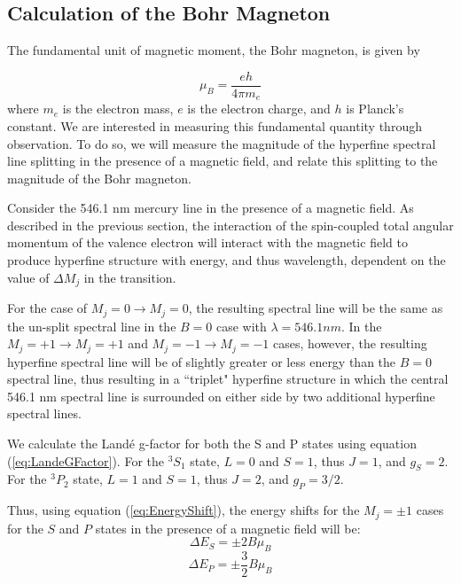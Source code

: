 \documentclass[twocolumn]{article}
\begin{document}
		\subsection{Calculation of the Bohr Magneton} \label{subsec:BohrCalc}
			The fundamental unit of magnetic moment, the Bohr magneton, is given by
			
			\begin{equation}
				\mu_B = \frac{eh}{4\pi m_e}
			\end{equation}
			where $m_e$ is the electron mass, $e$ is the electron charge, and $h$ is Planck's constant.
			We are interested in measuring this fundamental quantity through observation.
			To do so, we will measure the magnitude of the hyperfine spectral line splitting in the presence of a magnetic field, and relate this splitting to the magnitude of the Bohr magneton.
			
			Consider the 546.1 nm mercury line in the presence of a magnetic field.
			As described in the previous section, the interaction of the spin-coupled total angular momentum of the valence electron will interact with the magnetic field to produce hyperfine structure with energy, and thus wavelength, dependent on the value of $\Delta M_j$ in the transition.
			
			For the case of $M_j = 0 \rightarrow M_j = 0$, the resulting spectral line will be the same as the un-split spectral line in the $B=0$ case with $\lambda = 546.1 nm$.
			In the $M_j = +1 \rightarrow M_j = +1$ and $M_j = -1 \rightarrow M_j = -1$ cases, however, the resulting hyperfine spectral line will be of slightly greater or less energy than the $B=0$ spectral line, thus resulting in a ``triplet" hyperfine structure in which the central 546.1 nm spectral line is surrounded on either side by two additional hyperfine spectral lines.
			
			We calculate the Land\'{e} g-factor for both the S and P states using equation (\ref{eq:LandeGFactor}).
			For the $^3S_1$ state, $L=0$ and $S=1$, thus $J = 1$, and $g_S = 2$.
			For the $^3P_2$ state, $L=1$ and $S=1$, thus $J=2$, and $g_P = 3/2$.
			
			Thus, using equation (\ref{eq:EnergyShift}), the energy shifts for the $M_j = \pm1$ cases for the $S$ and $P$ states in the presence of a magnetic field will be:
			\begin{equation}
				\Delta E_S = \pm 2B\mu_B
			\end{equation}
			\begin{equation}
				\Delta E_P = \pm \frac{3}{2}B\mu_B
			\end{equation}
			
\end{document}

